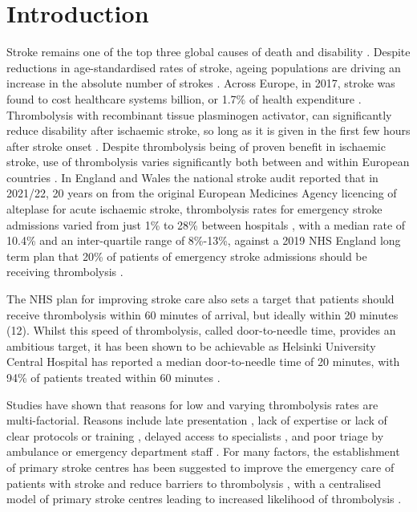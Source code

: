 \section{Introduction}



Stroke remains one of the top three global causes of death and disability \cite{feigin_global_2021}. Despite reductions in age-standardised rates of stroke, ageing populations are driving an increase in the absolute number of strokes \cite{feigin_global_2021}. Across Europe, in 2017, stroke was found to cost healthcare systems  billion, or 1.7\% of health expenditure \cite{luengo-fernandez_economic_2020}. Thrombolysis with recombinant tissue plasminogen activator, can significantly reduce disability after ischaemic stroke, so long as it is given in the first few hours after stroke onset \cite{emberson_effect_2014}. Despite thrombolysis being of proven benefit in ischaemic stroke, use of thrombolysis varies significantly both between and within European countries \cite{aguiar_de_sousa_access_2019}. In England and Wales the national stroke audit reported that in 2021/22, 20 years on from the original European Medicines Agency licencing of alteplase for acute ischaemic stroke, thrombolysis rates for emergency stroke admissions varied from just 1\% to 28\% between hospitals \cite{sentinel_national_stroke_audit_programme_ssnap_2022}, with a median rate of 10.4\% and an inter-quartile range of 8\%-13\%, against a 2019 NHS England long term plan that 20\% of patients of emergency stroke admissions should be receiving thrombolysis \cite{nhs_long_term_plan_2019}.

The NHS plan for improving stroke care also sets a target that patients should receive thrombolysis within 60 minutes of arrival, but ideally within 20 minutes (12). Whilst this speed of thrombolysis, called door-to-needle time, provides an ambitious target, it has been shown to be achievable as Helsinki University Central Hospital has reported a median door-to-needle time of 20 minutes, with 94\% of patients treated within 60 minutes \cite{meretoja_reducing_2012}.


Studies have shown that reasons for low and varying thrombolysis rates are multi-factorial. Reasons include late presentation \cite{aguiar_de_sousa_access_2019}, lack of expertise \cite{aguiar_de_sousa_access_2019} or lack of clear protocols or training \cite{carter-jones_stroke_2011}, delayed access to specialists \cite{kamal_delays_2017}, and poor triage by ambulance or emergency department staff \cite{carter-jones_stroke_2011}. For many factors, the establishment of primary stroke centres has been suggested to improve the emergency care of patients with stroke and reduce barriers to thrombolysis \cite{carter-jones_stroke_2011}, with a centralised model of primary stroke centres leading to increased likelihood of thrombolysis \cite{lahr_proportion_2012, morris_impact_2014, hunter_impact_2013}. 


